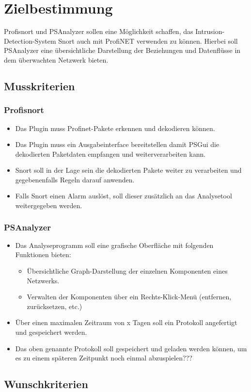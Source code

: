 \chapter{Zielbestimmung}

Profisnort und PSAnalyzer sollen eine Möglichkeit schaffen, das Intrusion-Detection-System Snort auch mit ProfiNET verwenden zu können.
Hierbei soll PSAnalyzer eine übersichtliche Darstellung der Beziehungen und Datenflüsse in dem überwachten Netzwerk bieten.

\section{Musskriterien}

\subsection{Profisnort}
\begin{itemize}
  \item Das Plugin muss Profinet-Pakete erkennen und dekodieren können.
  \item Das Plugin muss ein Ausgabeinterface bereitstellen damit PSGui die dekodierten Paketdaten empfangen und weiterverarbeiten kann.
  \item Snort soll in der Lage sein die dekodierten Pakete weiter zu verarbeiten und gegebenenfalls Regeln darauf anwenden.
  \item Falls Snort einen Alarm auslöst, soll dieser zusätzlich an das Analysetool weitergegeben werden.
\end{itemize}

\subsection{PSAnalyzer}
\begin{itemize}
  \item Das Analyseprogramm soll eine grafische Oberfläche mit folgenden Funktionen bieten:
  \begin{itemize}
    \item Übersichtliche Graph-Darstellung der einzelnen Komponenten eines Netzwerks.
    \item Verwalten der Komponenten über ein Rechts-Klick-Menü (entfernen, zurücksetzen, etc.)
  \end{itemize}
  \item Über einen maximalen Zeitraum von x Tagen soll ein Protokoll angefertigt und gespeichert werden.
  \item Das oben genannte Protokoll soll gespeichert und geladen werden können, um es zu einem späteren Zeitpunkt noch einmal abzuspielen???
\end{itemize}

\section{Wunschkriterien} 